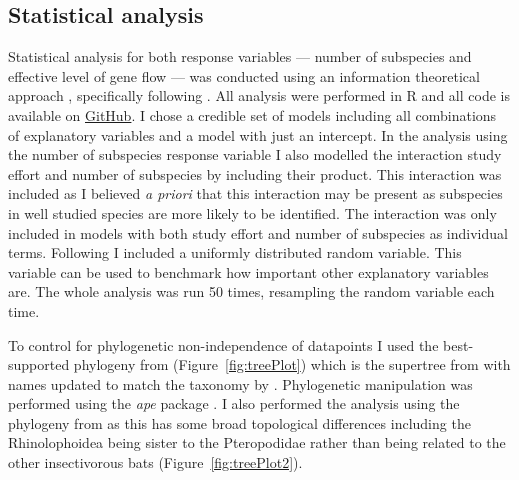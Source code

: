 \subsection{Statistical analysis}

Statistical analysis for both response variables --- number of subspecies and effective level of gene flow --- was conducted using an information theoretical approach \cite{burnham2002model}, specifically following \textcite{whittingham2005habitat, whittingham2006we}.
All analysis were performed in R \cite{R} and all code is available on \href{https://github.com/timcdlucas/PhDThesis/blob/master/Chapter3.Rtex}{GitHub}.
I chose a credible set of models including all combinations of explanatory variables and a model with just an intercept.
In the analysis using the number of subspecies response variable I also modelled the interaction study effort and number of subspecies by including their product.
This interaction was included as I believed \emph{a priori} that this interaction may be present as subspecies in well studied species are more likely to be identified.
The interaction was only included in models with both study effort and number of subspecies as individual terms.
Following \textcite{whittingham2005habitat} I included a uniformly distributed random variable.
This variable can be used to benchmark how important other explanatory variables are.
The whole analysis was run 50 times, resampling the random variable each time.


To control for phylogenetic non-independence of datapoints I used the best-supported phylogeny from \textcite{fritz2009geographical} (Figure~\ref{fig:treePlot}) which is the supertree from \textcite{bininda2007delayed} with names updated to match the taxonomy by \textcite{wilson2005mammal}.
Phylogenetic manipulation was performed using the \emph{ape} package \cite{ape}.
I also performed the analysis using the phylogeny from \textcite{jones2005bats} as this has some broad topological differences including the Rhinolophoidea being sister to the Pteropodidae rather than being related to the other insectivorous bats (Figure~\ref{fig:treePlot2}). 






